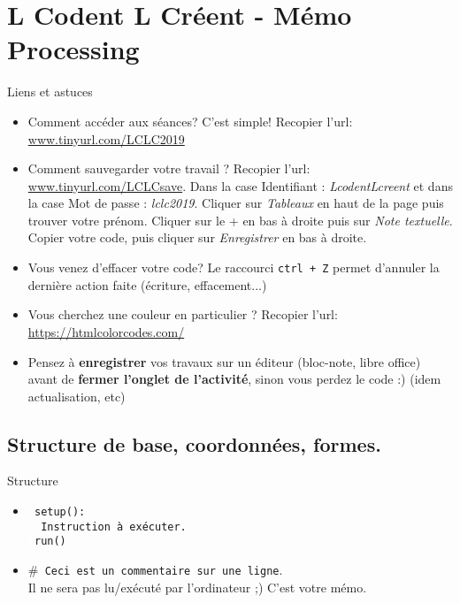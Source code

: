 \documentclass[a4paper, 8pt]{article}
\date{}
\author{~}
\theoremstyle{definition}
\begin{document}
\everymath{\displaystyle}
\section*{\textcolor{redStruc}{L Codent L Créent - Mémo Processing}}


\begin{bclogo}[logo = \bclampe, arrondi = 0.1, barre=none, epBord = 0.2]{\textcolor{redStruc}{Liens et astuces}}
\begin{itemize}[font= \color{redStruc} \small , label = \textbullet ]
\item \colorbox{yellow!50}{
Comment accéder aux séances? C'est simple! Recopier l'url:   \url{www.tinyurl.com/LCLC2019}}
\item Comment sauvegarder votre travail ? Recopier l'url:   \url{www.tinyurl.com/LCLCsave}. 
Dans la case Identifiant : \textit{LcodentLcreent} et dans la case Mot de passe : \textit{lclc2019}. Cliquer sur \textit{Tableaux} en haut de la page puis trouver votre prénom. Cliquer sur le + en bas à droite puis sur \textit{Note textuelle}. Copier votre code, puis cliquer sur \textit{Enregistrer} en bas à droite.
\item Vous venez d'effacer votre code? Le raccourci \texttt{ctrl + Z} permet d'annuler la dernière action faite (écriture, effacement...)
\item Vous cherchez une couleur en particulier ? Recopier l'url:  \url{https://htmlcolorcodes.com/}
\item \bcattention Pensez à \textbf{enregistrer} vos travaux sur un éditeur (bloc-note, libre office) avant de \textbf{fermer l'onglet de l'activité}, sinon vous perdez le code :) (idem actualisation, etc)
\end{itemize}
\end{bclogo}

\subsection*{Structure de base, coordonnées, formes.}





\begin{bclogo}[logo = \bccrayon, arrondi = 0.1, noborder = true]{\textcolor{redStruc}{Structure}}
\begin{itemize}[font= \color{redStruc} \small , label = \textbullet ]
\item  \texttt{ setup(): \\ \textcolor{white}{bl}Instruction à exécuter.\\ \textcolor{white}{l}run()}
\item \texttt{\textcolor{greenCom}{$\#$ Ceci est un commentaire sur une ligne}}.
\\Il ne sera pas lu/exécuté par l'ordinateur ;) C'est votre mémo.
\end{itemize}
\end{bclogo}
\end{document}
